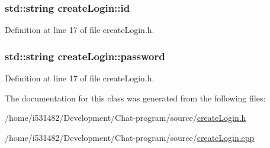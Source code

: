 \subsubsection[{\texorpdfstring{id}{id}}]{\setlength{\rightskip}{0pt plus 5cm}std\+::string create\+Login\+::id\hspace{0.3cm}{\ttfamily [private]}}\hypertarget{classcreate_login_a0269d9bbbeaec3c108901f8a4a36665d}{}\label{classcreate_login_a0269d9bbbeaec3c108901f8a4a36665d}


Definition at line 17 of file create\+Login.\+h.

\subsubsection[{\texorpdfstring{password}{password}}]{\setlength{\rightskip}{0pt plus 5cm}std\+::string create\+Login\+::password\hspace{0.3cm}{\ttfamily [private]}}\hypertarget{classcreate_login_aee8e305c94308da429f2f2e7c6d08370}{}\label{classcreate_login_aee8e305c94308da429f2f2e7c6d08370}


Definition at line 17 of file create\+Login.\+h.



The documentation for this class was generated from the following files\+:\begin{DoxyCompactItemize}
\item 
/home/i531482/\+Development/\+Chat-\/program/source/\hyperlink{create_login_8h}{create\+Login.\+h}\item 
/home/i531482/\+Development/\+Chat-\/program/source/\hyperlink{create_login_8cpp}{create\+Login.\+cpp}\end{DoxyCompactItemize}

